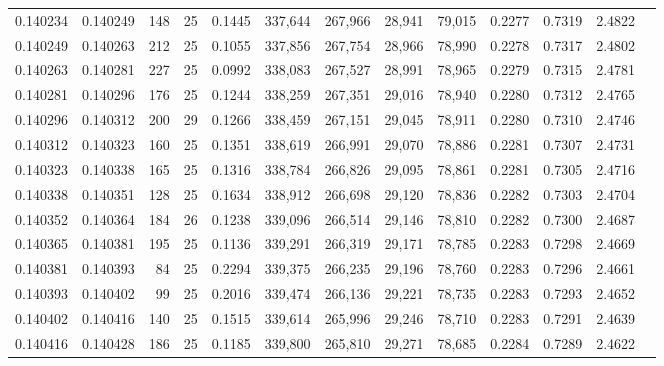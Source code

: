 \begin{tabular}{rrrrrrrrrrrrr}
0.140234 & 0.140249 &   148 &  25 &                                     0.1445 & 337,644 & 267,966 &  28,941 &  79,015 & 0.2277 & 0.7319 & 2.4822 \\
0.140249 & 0.140263 &   212 &  25 &                                     0.1055 & 337,856 & 267,754 &  28,966 &  78,990 & 0.2278 & 0.7317 & 2.4802 \\
0.140263 & 0.140281 &   227 &  25 &                                     0.0992 & 338,083 & 267,527 &  28,991 &  78,965 & 0.2279 & 0.7315 & 2.4781 \\
0.140281 & 0.140296 &   176 &  25 &                                     0.1244 & 338,259 & 267,351 &  29,016 &  78,940 & 0.2280 & 0.7312 & 2.4765 \\
0.140296 & 0.140312 &   200 &  29 &                                     0.1266 & 338,459 & 267,151 &  29,045 &  78,911 & 0.2280 & 0.7310 & 2.4746 \\
0.140312 & 0.140323 &   160 &  25 &                                     0.1351 & 338,619 & 266,991 &  29,070 &  78,886 & 0.2281 & 0.7307 & 2.4731 \\
0.140323 & 0.140338 &   165 &  25 &                                     0.1316 & 338,784 & 266,826 &  29,095 &  78,861 & 0.2281 & 0.7305 & 2.4716 \\
0.140338 & 0.140351 &   128 &  25 &                                     0.1634 & 338,912 & 266,698 &  29,120 &  78,836 & 0.2282 & 0.7303 & 2.4704 \\
0.140352 & 0.140364 &   184 &  26 &                                     0.1238 & 339,096 & 266,514 &  29,146 &  78,810 & 0.2282 & 0.7300 & 2.4687 \\
0.140365 & 0.140381 &   195 &  25 &                                     0.1136 & 339,291 & 266,319 &  29,171 &  78,785 & 0.2283 & 0.7298 & 2.4669 \\
0.140381 & 0.140393 &    84 &  25 &                                     0.2294 & 339,375 & 266,235 &  29,196 &  78,760 & 0.2283 & 0.7296 & 2.4661 \\
0.140393 & 0.140402 &    99 &  25 &                                     0.2016 & 339,474 & 266,136 &  29,221 &  78,735 & 0.2283 & 0.7293 & 2.4652 \\
0.140402 & 0.140416 &   140 &  25 &                                     0.1515 & 339,614 & 265,996 &  29,246 &  78,710 & 0.2283 & 0.7291 & 2.4639 \\
0.140416 & 0.140428 &   186 &  25 &                                     0.1185 & 339,800 & 265,810 &  29,271 &  78,685 & 0.2284 & 0.7289 & 2.4622 \\

\end{tabular}
